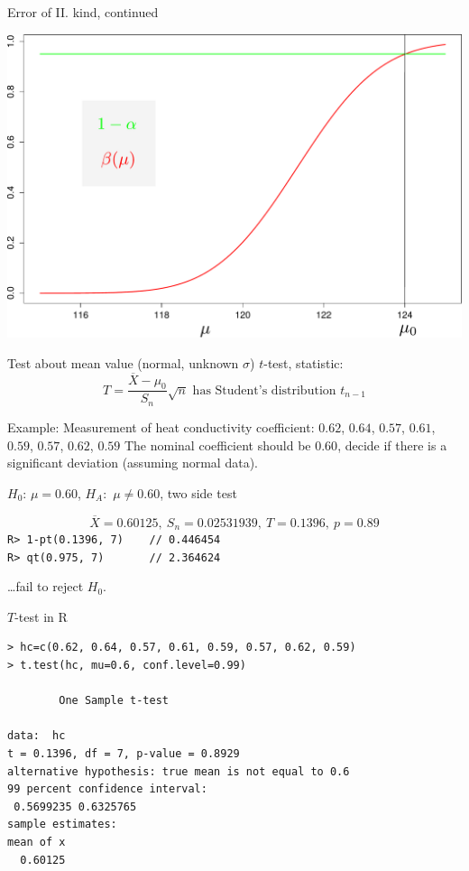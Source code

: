 \documentclass[smaller]{beamer}
\def\ol#1{\overline{#1}}
\def\blue#1{{\usebeamercolor[fg]{my blue} #1}}
\def\df#1{{\usebeamercolor[fg]{my orange} #1}}
\def\xskip{{\vspace{2ex}}}
\begin{document}
\begin{frame}{Error of II. kind, continued}
    \begin{center}
    \includegraphics[scale=0.35]{./08_second_error.pdf}
    \end{center} 
\end{frame}


\begin{frame}[fragile]{Test about mean value (normal, unknown $\sigma$)}
\df{$t$-test}, statistic:
\[
  T = \frac{\ol{X} - \mu_0}{S_n} \sqrt{n} \text{ has Student's distribution } t_{n-1}
\]

\blue{Example:} 
Measurement of heat conductivity coefficient: $0.62$, $0.64$, $0.57$, $0.61$, $0.59$, $0.57$, $0.62$, $0.59$
The nominal coefficient should be $0.60$, decide if there is a significant deviation (assuming normal data).

\xskip
$H_0$: $\mu = 0.60$, $H_A:$ $\mu\ne 0.60$, two side test

\[
  \ol{X} = 0.60125,\ S_n = 0.02531939,\ T=0.1396,\ p=0.89 
\]
\verb'R> 1-pt(0.1396, 7)    // 0.446454'\\
\verb'R> qt(0.975, 7)       // 2.364624'

\xskip
\dots fail to reject $H_0$.
\end{frame}

\begin{frame}[fragile]{$T$-test in R}
\begin{verbatim}
> hc=c(0.62, 0.64, 0.57, 0.61, 0.59, 0.57, 0.62, 0.59)
> t.test(hc, mu=0.6, conf.level=0.99)

        One Sample t-test

data:  hc 
t = 0.1396, df = 7, p-value = 0.8929
alternative hypothesis: true mean is not equal to 0.6 
99 percent confidence interval:
 0.5699235 0.6325765 
sample estimates:
mean of x 
  0.60125  
\end{verbatim}
\end{frame}
\end{document}
